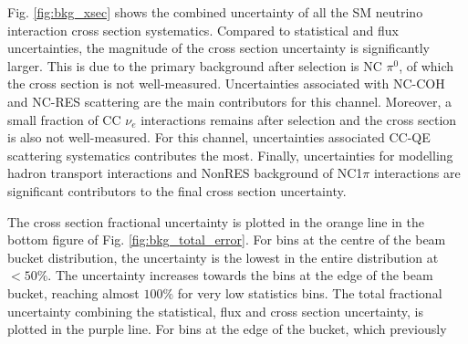 Fig. \ref{fig:bkg_xsec} shows the combined uncertainty of all the SM neutrino interaction cross section systematics.
Compared to statistical and flux uncertainties, the magnitude of the cross section uncertainty is significantly larger.
This is due to the primary background after selection is NC $\pi^0$, of which the cross section is not well-measured.  
Uncertainties associated with NC-COH and NC-RES scattering are the main contributors for this channel.
Moreover, a small fraction of CC $\nu_e$ interactions remains after selection and the cross section is also not well-measured.
For this channel, uncertainties associated CC-QE scattering systematics contributes the most.
Finally, uncertainties for modelling hadron transport interactions and NonRES background of NC1$\pi$ interactions are significant contributors to the final cross section uncertainty.

The cross section fractional uncertainty is plotted in the orange line in the bottom figure of Fig. \ref{fig:bkg_total_error}.
For bins at the centre of the beam bucket distribution, the uncertainty is the lowest in the entire distribution at $< 50\%$.
The uncertainty increases towards the bins at the edge of the beam bucket, reaching almost $100 \%$ for very low statistics bins.
The total fractional uncertainty combining the statistical, flux and cross section uncertainty, is plotted in the purple line.
For bins at the edge of the bucket, which previously


